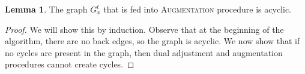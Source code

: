 \documentclass[a4paper,11pt]{article}
\newcommand{\eps}{\varepsilon}
\theoremstyle{definition}
\theoremstyle{definition}
\theoremstyle{definition}
\theoremstyle{definition}
\theoremstyle{definition}
\newtheorem{lemma2}[definition2]{Lemma}
\theoremstyle{definition}
\theoremstyle{definition}
\theoremstyle{definition}
\theoremstyle{definition}
\theoremstyle{definition}
\theoremstyle{definition}
\theoremstyle{definition}
\theoremstyle{definition}
\theoremstyle{definition}
\theoremstyle{definition}
\begin{document}
\begin{lemma2}\label{lem:acyclic}
The graph $G^t_x$ that is fed into \textsc{Augmentation} procedure is acyclic.
\end{lemma2}
\begin{proof}
We will show this by induction. Observe that at the beginning of the algorithm, there are no back edges, so the graph is acyclic. We now show that if no cycles are present in the graph, then dual adjustment and augmentation procedures cannot create cycles.

\end{proof}
\end{document}
